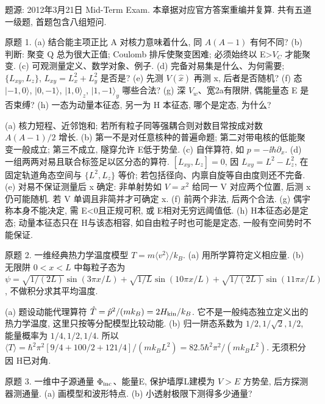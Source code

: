 题源: 2012年3月21日 Mid-Term Exam. 本章据对应官方答案重编并复算. 共有五道一级题, 首题包含八组短问.
\begin{exercise}\label{ex:2202-e2012-1}
原题 1. (a) 结合能主项正比 A 对核力意味着什么, 同 $A(A-1)$ 有何不同? (b) 判断: 聚变 Q 总为很大正值; Coulomb 排斥使聚变困难; 必须始终以 E>$V_C$ 才能聚变. (c) 可观测量定义、数学对象、例子. (d) 完备对易集是什么、为何需要; $\{L_{xy},L_z\}$, $L_{xy}=L_x^2+L_y^2$ 是否是? (e) 先测 $V(\hat x)$ 再测 x, 后者是否随机? (f) 态 $|-1,0\rangle$, $|0,-1\rangle$, $|1,0\rangle_z$, $|1,-1\rangle_y$ 哪些合法? (g) 深 $V_w$、宽2a有限阱, 偶能量态 E 是否束缚? (h) 一态为动量本征态, 另一为 H 本征态, 哪个是定态, 为什么?
\end{exercise}
\begin{solution}
(a) 核力短程、近邻饱和; 若所有粒子同等强耦合则对数目常按成对数 $A(A-1)/2$ 增长. (b) 第一不是对任意核种的普遍命题; 第二对带电核的低能聚变一般成立; 第三不成立, 隧穿允许 E低于势垒. (c) 自伴算符, 如 $p=-\ii\hbar\partial_x$. (d) 一组两两对易且联合标签足以区分态的算符. $[L_{xy},L_z]=0$, 因 $L_{xy}=L^2-L_z^2$, 在固定轨道角态空间与 $\{L^2,L_z\}$ 等价; 若包括径向、内禀自旋等自由度则还不完备. (e) 对易不保证测量后 x 确定: 非单射势如 $V=x^2$ 给同一 V 对应两个位置, 后测 x仍可能随机. 若 V 单调且非简并才可确定 x. (f) 前两个非法, 后两个合法. (g) 偶宇称本身不能决定, 需 E<0且正规可积, 或 E相对无穷远阈值低. (h) H本征态必是定态; 动量本征态只在 H与该态相容, 如自由粒子时也可能是定态, 一般有空间势时不能保证.
\end{solution}
\begin{exercise}\label{ex:2202-e2012-2}
原题 2. 一维经典热力学温度模型 $T=m\langle v^2\rangle/k_B$. (a) 用所学算符定义相应量. (b) 无限阱 $0<x<L$ 中每粒子态为
$\psi=\sqrt{1/(2L)}\sin(3\pi x/L)+\sqrt{1/L}\sin(10\pi x/L)+\sqrt{1/(2L)}\sin(11\pi x/L)$, 不做积分求其平均温度.
\end{exercise}
\begin{solution}
(a) 题设动能代理算符 $\hat T=\hat p^2/(mk_B)=2H_{\rm kin}/k_B$. 它不是一般纯态独立定义出的热力学温度, 这里只按等分配模型比较动能. (b) 归一阱态系数为 $1/2,1/\sqrt2,1/2$, 能量概率为 $1/4,1/2,1/4$. 所以 $\langle T\rangle=\hbar^2\pi^2[9/4+100/2+121/4]/(mk_BL^2)=82.5\hbar^2\pi^2/(mk_BL^2)$. 无须积分因 H已对角.
\end{solution}
\begin{exercise}\label{ex:2202-e2012-3}
原题 3. 一维中子源通量 $\Phi_{\rm inc}$、能量E, 保护墙厚L建模为 $V>E$ 方势垒, 后方探测器测通量. (a) 画模型和波形特点. (b) 小透射极限下测得多少通量?
\end{exercise}
